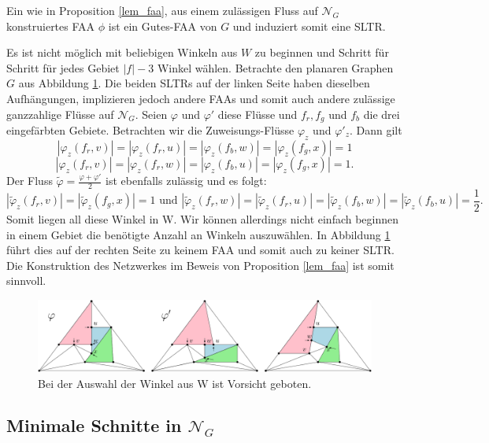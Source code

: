 \begin{conjecture}\label{faa_conj}
Ein wie in Proposition \ref{lem_faa}, aus einem zulässigen Fluss auf $\mathcal{N}_G$ konstruiertes FAA $\phi$ ist ein Gutes-FAA von $G$ und induziert somit eine SLTR.
\end{conjecture}

\begin{example}
Es ist nicht möglich mit beliebigen Winkeln aus $W$ zu beginnen und Schritt für Schritt für jedes Gebiet $|f|-3$ Winkel wählen. Betrachte den planaren Graphen $G$ aus Abbildung \ref{lem_faa_choice_ex}. Die beiden SLTRs auf der linken Seite haben dieselben Aufhängungen, implizieren jedoch andere FAAs und somit auch andere zulässige ganzzahlige Flüsse auf $\mathcal{N}_G$. Seien $\varphi$ und $\varphi'$ diese Flüsse und $f_{r},f_{g}$ und $f_b$ die drei eingefärbten Gebiete. Betrachten wir die Zuweisungs-Flüsse $\varphi_z$ und $\varphi'_z$. Dann gilt $$|\varphi_z(f_r,v)|=|\varphi_z(f_r,u)|=|\varphi_z(f_b,w)| = |\varphi_z(f_g,x)| = 1$$
$$|\varphi_z(f_r,v)|=|\varphi_z(f_r,w)|=|\varphi_z(f_b,u)| = |\varphi_z(f_g,x)| = 1.$$
Der Fluss $\tilde{\varphi}=\frac{\varphi+\varphi'}{2}$ ist ebenfalls zulässig und es folgt:
$$|\tilde{\varphi}_z(f_r,v)|=|\tilde{\varphi}_z(f_g,x)| = 1 \text{ und } |\tilde{\varphi}_z(f_r,w)|=|\tilde{\varphi}_z(f_r,u)| = |\tilde{\varphi}_z(f_b,w)|=|\tilde{\varphi}_z(f_b,u)| = \frac{1}{2}.$$
Somit liegen all diese Winkel in W. Wir können allerdings nicht einfach beginnen in einem Gebiet die benötigte Anzahl an Winkeln auszuwählen. In Abbildung \ref{lem_faa_choice_ex} führt dies auf der rechten Seite zu keinem FAA und somit auch zu keiner SLTR. Die Konstruktion des Netzwerkes im Beweis von Proposition \ref{lem_faa} ist somit sinnvoll.

\begin{figure}[h]
\centering
\includegraphics[width=1\textwidth]{lem_faa_choice_ex.png}
\caption{Bei der Auswahl der Winkel aus W ist Vorsicht geboten.}
\label{lem_faa_choice_ex}
\end{figure}
\end{example}

\subsection{Minimale Schnitte in $\mathcal{N}_G$}

